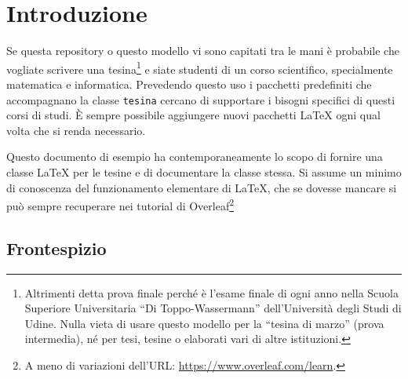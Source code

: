 \documentclass[italian]{tesina-class/tesina}
\theoremstyle{definition}
\theoremstyle{plain}
\begin{document}
\maketitle

\begin{abstract}
Questo è un modello \LaTeX{} per una tesina della Scuola Superiore, semplice ma allo stesso tempo completo, riutilizzabile e adattabile.
È mirato a studenti di materie scientifiche, in particolar modo matematica e informatica, ma smanettando un po' si adatta a tutti.
\end{abstract}


\tableofcontents



\newpage

\section{Introduzione}

Se questa repository o questo modello vi sono capitati tra le mani è probabile che vogliate scrivere una tesina\footnote{
    Altrimenti detta prova finale perché è l'esame finale di ogni anno nella Scuola Superiore Universitaria \enquote{Di Toppo-Wassermann} dell'Università degli Studi di Udine.
    Nulla vieta di usare questo modello per la \enquote{tesina di marzo} (prova intermedia), né per tesi, tesine o elaborati vari di altre istituzioni.
} e siate studenti di un corso scientifico, specialmente matematica e informatica.
Prevedendo questo uso i pacchetti predefiniti che accompagnano la classe \texttt{tesina} cercano di supportare i bisogni specifici di questi corsi di studi.
È sempre possibile aggiungere nuovi pacchetti \LaTeX{} ogni qual volta che si renda necessario.

Questo documento di esempio ha contemporaneamente lo scopo di fornire una classe \LaTeX{} per le tesine e di documentare la classe stessa.
Si assume un minimo di conoscenza del funzionamento elementare di \LaTeX{}, che se dovesse mancare si può sempre recuperare nei tutorial di Overleaf\footnote{
    A meno di variazioni dell'URL: \url{https://www.overleaf.com/learn}.
}

\subsection{Frontespizio}
\end{document}
